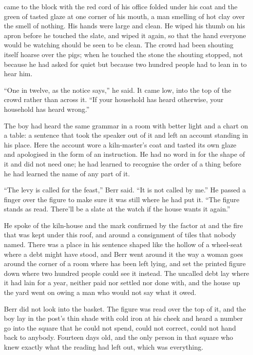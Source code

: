  came to the block with the red cord of his office folded under his coat and the green of tasted glaze at one corner of his mouth, a man smelling of hot clay over the smell of nothing. His hands were large and clean. He wiped his thumb on his apron before he touched the slate, and wiped it again, so that the hand everyone would be watching should be seen to be clean. The crowd had been shouting itself hoarse over the pigs; when he touched the stone the shouting stopped, not because he had asked for quiet but because two hundred people had to lean in to hear him.

“One in twelve, as the notice says,” he said. It came low, into the top of the crowd rather than across it. “If your household has heard otherwise, your household has heard wrong.”

The boy had heard the same grammar in a room with better light and a chart on a table: a sentence that took the speaker out of it and left an account standing in his place. Here the account wore a kiln-master's coat and tasted its own glaze and apologised in the form of an instruction. He had no word in  for the shape of it and did not need one; he had learned to recognise the order of a thing before he had learned the name of any part of it.

“The levy is called for the feast,” Berr said. “It is not called by me.” He passed a finger over the figure to make sure it was still where he had put it. “The figure stands as read. There'll be a slate at the watch if the house wants it again.”

He spoke of the kiln-house and the mark confirmed by the factor at  and the fire that was kept under this roof, and around a consignment of tiles that nobody named. There was a place in his sentence shaped like the hollow of a wheel-seat where a debt might have stood, and Berr went around it the way a woman goes around the corner of a room where  has been left lying, and set the printed figure down where two hundred people could see it instead. The uncalled debt lay where it had lain for a year, neither paid nor settled nor done with, and the house up the yard went on owing a man who would not say what it owed.

Berr did not look into the basket. The figure was read over the top of it, and the boy lay in the post's thin shade with cold iron at his cheek and heard a number go into the square that he could not spend, could not correct, could not hand back to anybody. Fourteen days old, and the only person in that square who knew exactly what the reading had left out, which was everything.

